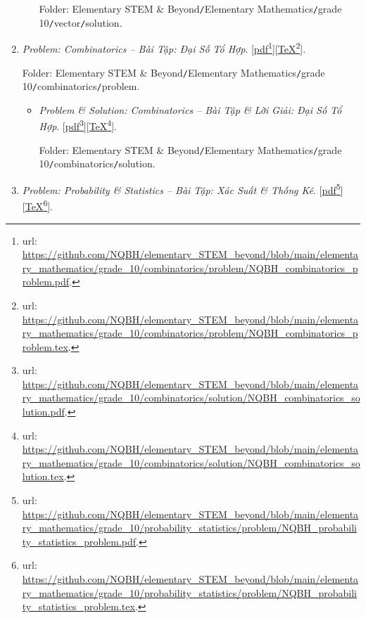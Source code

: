 \documentclass[12pt,twoside]{book}
\begin{document}
\begin{enumerate}
\begin{itemize}
		Folder: {\sf Elementary STEM \& Beyond{\tt/}Elementary Mathematics{\tt/}grade 10{\tt/}vector{\tt/}solution}.
	\end{itemize}
	\item {\it Problem: Combinatorics -- Bài Tập: Đại Số Tổ Hợp}. [\href{https://github.com/NQBH/elementary_STEM_beyond/blob/main/elementary_mathematics/grade_10/combinatorics/problem/NQBH_combinatorics_problem.pdf}{pdf}\footnote{{\sc url}: \url{https://github.com/NQBH/elementary_STEM_beyond/blob/main/elementary_mathematics/grade_10/combinatorics/problem/NQBH_combinatorics_problem.pdf}.}][\href{https://github.com/NQBH/elementary_STEM_beyond/blob/main/elementary_mathematics/grade_10/combinatorics/problem/NQBH_combinatorics_problem.tex}{\TeX}\footnote{{\sc url}: \url{https://github.com/NQBH/elementary_STEM_beyond/blob/main/elementary_mathematics/grade_10/combinatorics/problem/NQBH_combinatorics_problem.tex}.}].
	
	Folder: {\sf Elementary STEM \& Beyond{\tt/}Elementary Mathematics{\tt/}grade 10{\tt/}combinatorics{\tt/}problem}.
	\begin{itemize}
		\item {\it Problem \& Solution: Combinatorics -- Bài Tập \& Lời Giải: Đại Số Tổ Hợp}. [\href{https://github.com/NQBH/elementary_STEM_beyond/blob/main/elementary_mathematics/grade_10/combinatorics/solution/NQBH_combinatorics_solution.pdf}{pdf}\footnote{{\sc url}: \url{https://github.com/NQBH/elementary_STEM_beyond/blob/main/elementary_mathematics/grade_10/combinatorics/solution/NQBH_combinatorics_solution.pdf}.}][\href{https://github.com/NQBH/elementary_STEM_beyond/blob/main/elementary_mathematics/grade_10/combinatorics/solution/NQBH_combinatorics_solution.tex}{\TeX}\footnote{{\sc url}: \url{https://github.com/NQBH/elementary_STEM_beyond/blob/main/elementary_mathematics/grade_10/combinatorics/solution/NQBH_combinatorics_solution.tex}.}].
		
		Folder: {\sf Elementary STEM \& Beyond{\tt/}Elementary Mathematics{\tt/}grade 10{\tt/}combinatorics{\tt/}solution}.
	\end{itemize}
	\item {\it Problem: Probability \& Statistics -- Bài Tập: Xác Suất \& Thống Kê}. [\href{https://github.com/NQBH/elementary_STEM_beyond/blob/main/elementary_mathematics/grade_10/probability_statistics/problem/NQBH_probability_statistics_problem.pdf}{pdf}\footnote{{\sc url}: \url{https://github.com/NQBH/elementary_STEM_beyond/blob/main/elementary_mathematics/grade_10/probability_statistics/problem/NQBH_probability_statistics_problem.pdf}.}][\href{https://github.com/NQBH/elementary_STEM_beyond/blob/main/elementary_mathematics/grade_10/probability_statistics/problem/NQBH_probability_statistics_problem.tex}{\TeX}\footnote{{\sc url}: \url{https://github.com/NQBH/elementary_STEM_beyond/blob/main/elementary_mathematics/grade_10/probability_statistics/problem/NQBH_probability_statistics_problem.tex}.}].
	

\end{enumerate}
\end{document}
